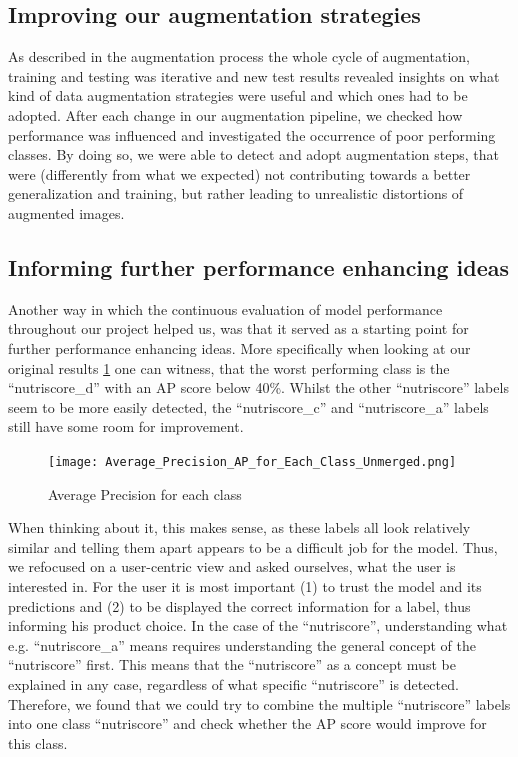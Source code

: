 \subsection{Improving our augmentation strategies}

As described in the augmentation process the whole cycle of augmentation, training and testing was iterative and new test results revealed insights on what kind of data augmentation strategies were useful and which ones had to be adopted. After each change in our augmentation pipeline, we checked how performance was influenced and investigated the occurrence of poor performing classes. By doing so, we were able to detect and adopt augmentation steps, that were (differently from what we expected) not contributing towards a better generalization and training, but rather leading to unrealistic distortions of augmented images. 

\subsection{Informing further performance enhancing ideas}

Another way in which the continuous evaluation of model performance throughout our project helped us, was that it served as a starting point for further performance enhancing ideas. More specifically when looking at our original results \ref{fig:ap_unmerged} one can witness, that the worst performing class is the “nutriscore\_d” with an AP score below 40\%. Whilst the other “nutriscore” labels seem to be more easily detected, the “nutriscore\_c” and “nutriscore\_a” labels still have some room for improvement. 

\begin{figure}[H]
    \centering
    \texttt{[image: Average\_Precision\_AP\_for\_Each\_Class\_Unmerged.png]}
    \caption{Average Precision for each class}
    \label{fig:ap_unmerged}
\end{figure}

When thinking about it, this makes sense, as these labels all look relatively similar and telling them apart appears to be a difficult job for the model. Thus, we refocused on a user-centric view and asked ourselves, what the user is interested in. For the user it is most important (1) to trust the model and its predictions and (2) to be displayed the correct information for a label, thus informing his product choice. In the case of the “nutriscore”, understanding what e.g. “nutriscore\_a” means requires understanding the general concept of the “nutriscore” first. This means that the “nutriscore” as a concept must be explained in any case, regardless of what specific “nutriscore” is detected. Therefore, we found that we could try to combine the multiple “nutriscore” labels into one class “nutriscore” and check whether the AP score would improve for this class. 

